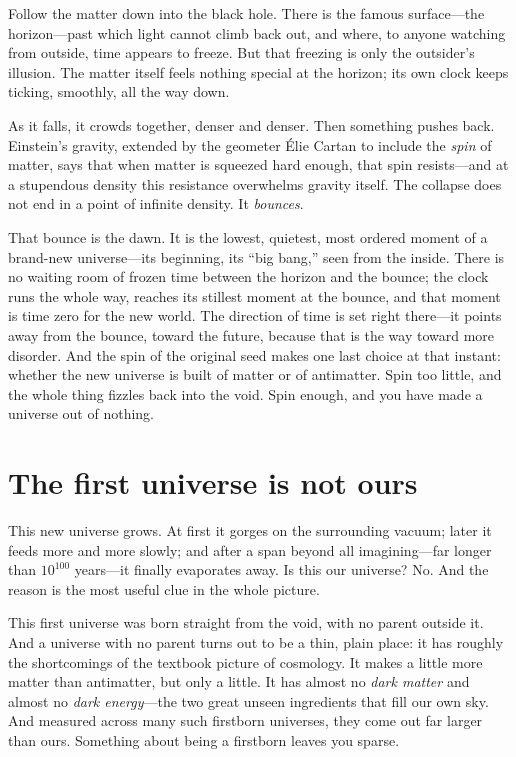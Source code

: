 Follow the matter down into the black hole. There is the famous surface---the
horizon---past which light cannot climb back out, and where, to anyone watching
from outside, time appears to freeze. But that freezing is only the outsider's
illusion. The matter itself feels nothing special at the horizon; its own clock
keeps ticking, smoothly, all the way down.

As it falls, it crowds together, denser and denser. Then something pushes back.
Einstein's gravity, extended by the geometer \'Elie Cartan to include the
\emph{spin} of matter, says that when matter is squeezed hard enough, that spin
resists---and at a stupendous density this resistance overwhelms gravity itself.
The collapse does not end in a point of infinite density. It \emph{bounces}.

That bounce is the dawn. It is the lowest, quietest, most ordered moment of a
brand-new universe---its beginning, its ``big bang,'' seen from the inside. There
is no waiting room of frozen time between the horizon and the bounce; the clock
runs the whole way, reaches its stillest moment at the bounce, and that moment is
time zero for the new world. The direction of time is set right there---it points
away from the bounce, toward the future, because that is the way toward more
disorder. And the spin of the original seed makes one last choice at that instant:
whether the new universe is built of matter or of antimatter. Spin too little, and
the whole thing fizzles back into the void. Spin enough, and you have made a
universe out of nothing.

\section*{The first universe is not ours}

This new universe grows. At first it gorges on the surrounding vacuum; later it
feeds more and more slowly; and after a span beyond all imagining---far longer
than $10^{100}$ years---it finally evaporates away. Is this our universe? No. And
the reason is the most useful clue in the whole picture.

This first universe was born straight from the void, with no parent outside it.
And a universe with no parent turns out to be a thin, plain place: it has roughly
the shortcomings of the textbook picture of cosmology. It makes a little more
matter than antimatter, but only a little. It has almost no \emph{dark matter} and
almost no \emph{dark energy}---the two great unseen ingredients that fill our own
sky. And measured across many such firstborn universes, they come out far larger
than ours. Something about being a firstborn leaves you sparse.

